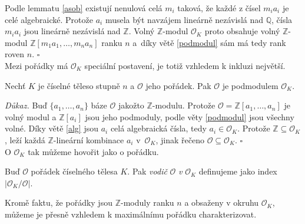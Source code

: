 \documentclass[12pt]{report}
\begin{document}
Podle lemmatu \ref{asob} existují nenulová celá $m_i$ taková, že každé z čísel $m_i a_i$ je celé algebraické. Protože $a_i$ musela být navzájem lineárně nezávislá nad $\mathbb{Q}$, čísla $m_i a_i$ jsou lineárně nezávislá nad $\mathbb{Z}$. Volný $\mathbb{Z}$-modul $\mathcal{O}_K$ proto obsahuje volný $\mathbb{Z}$-modul $\mathbb{Z}[m_1 a_1,\dots, m_n a_n]$ ranku $n$ a~díky větě \ref{podmodul} sám má tedy rank roven $n$. \hfill $\square$\\

Mezi pořádky má $\mathcal{O}_K$ speciální postavení, je totiž vzhledem k inkluzi největší.

\begin{veta}\label{podporadek}
Nechť $K$ je číselné těleso stupně $n$ a $\mathcal{O}$ jeho pořádek. Pak $\mathcal{O}$ je podmodulem $\mathcal{O}_K$.
\end{veta}

\noindent \textit{Důkaz.} Buď $\lbrace a_1, \dots,a_n \rbrace$ báze $\mathcal{O}$ jakožto $\mathbb{Z}$-modulu. Protože $\mathcal{O} = \mathbb{Z}[a_1,\dots,a_n]$ je volný modul a $\mathbb{Z}[a_i]$ jsou jeho podmoduly, podle věty \ref{podmodul} jsou všechny volné. Díky větě \ref{alg} jsou $a_i$ celá algebraická čísla, tedy $a_i \in \mathcal{O}_K$. Protože $\mathbb{Z} \subseteq \mathcal{O}_K$, leží každá $\mathbb{Z}$-lineární kombinace $a_i$ v~$\mathcal{O}_K$, jinak řečeno $\mathcal{O} \subseteq \mathcal{O}_K$. \hfill $\square$\\

O $\mathcal{O}_K$ tak můžeme hovořit jako o  pořádku.

\begin{definice}
Buď $\mathcal{O}$ pořádek číselného tělesa $K$. Pak \textit{vodič} $\mathcal{O}$ \textit{v} $\mathcal{O}_K$ definujeme jako index $\vert \mathcal{O}_K / \mathcal{O}\vert$.
\end{definice}

Kromě faktu, že pořádky jsou $\mathbb{Z}$-moduly ranku $n$ a obsaženy v okruhu $\mathcal{O}_K$, můžeme je přesně vzhledem k maximálnímu pořádku charakterizovat.
\end{document}
